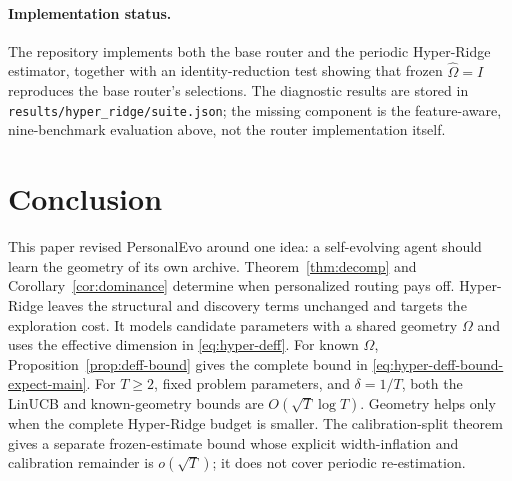\documentclass{article} %
\begin{document}
\paragraph{Implementation status.}
The repository implements both the base router and the periodic Hyper-Ridge estimator, together with an identity-reduction test showing that frozen $\widehat{\Omega}=I$ reproduces the base router's selections. The diagnostic results are stored in \texttt{results/hyper\_ridge/suite.json}; the missing component is the feature-aware, nine-benchmark evaluation above, not the router implementation itself.

\section{Conclusion}

\label{sec:conclusion}

This paper revised PersonalEvo around one idea: a self-evolving agent should
learn the geometry of its own archive. Theorem~\ref{thm:decomp} and
Corollary~\ref{cor:dominance} determine when personalized routing pays off.
Hyper-Ridge leaves the structural and discovery terms unchanged and targets
the exploration cost. It models candidate parameters with a shared geometry
\(\Omega\) and uses the effective dimension in \eqref{eq:hyper-deff}.
For known \(\Omega\), Proposition~\ref{prop:deff-bound} gives the complete
bound in \eqref{eq:hyper-deff-bound-expect-main}. For \(T\ge2\), fixed problem
parameters, and \(\delta=1/T\), both the LinUCB and known-geometry bounds are
\(O(\sqrt{T}\log T)\). Geometry helps only when the complete Hyper-Ridge budget
is smaller. The calibration-split theorem gives a separate frozen-estimate
bound whose explicit width-inflation and calibration remainder is
\(o(\sqrt T)\); it does not cover periodic re-estimation.
\end{document}

